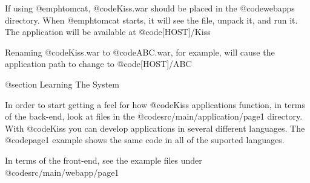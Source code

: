 If using @emph{tomcat}, @code{Kiss.war} should be placed in the @code{webapps} directory.  When @emph{tomcat} starts, it will see the file, unpack it, and run it.  The application will be available at @code{[HOST]/Kiss}

Renaming @code{Kiss.war} to @code{ABC.war}, for example, will cause the application path to change to @code{[HOST]/ABC}

@section Learning The System

In order to start getting a feel for how @code{Kiss} applications
function, in terms of the back-end, look at files in the
@code{src/main/application/page1} directory.  With @code{Kiss} you can
develop applications in several different languages.  The @code{page1}
example shows the same code in all of the suported languages.

In terms of the front-end, see the example files under @code{src/main/webapp/page1}
